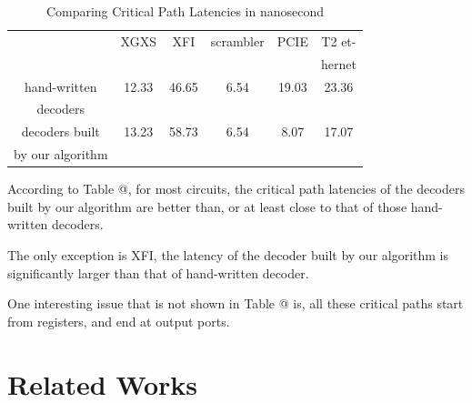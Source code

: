 \documentclass[journal]{IEEEtran}
\makeatletter
\newcommand{\Rmnum}[1]{\expandafter\@slowromancap\romannumeral #1@}
\makeatother
\begin{document}
\begin{table}[!t]
\centering
\caption{Comparing Critical Path Latencies in nanosecond}
\begin{tabular}{|c|c|c|c|c|c|}
\hline
&XGXS&XFI&scrambler&PCIE&T2 et-\\
&&&&&hernet\\ \hline
hand-written      &12.33       &46.65     &6.54         &19.03   &23.36          \\
decoders          &&&&&\\ \hline
decoders built     &13.23       &58.73     &6.54         &8.07   &17.07          \\
by our algorithm   &&&&&\\ \hline
\end{tabular}
\end{table}

According to Table \Rmnum{5},
for most circuits,
the critical path latencies of the decoders built by our algorithm are better than,
or at least close to that of those hand-written decoders.

The only exception is XFI,
the latency of the decoder built by our algorithm is significantly larger than that of hand-written decoder.

One interesting issue that is not shown in Table \Rmnum{5} is,
all these critical paths start from registers, and end at output ports.

\section{Related Works}\label{sec_relwork}
%
%
%
%
%
\end{document}
